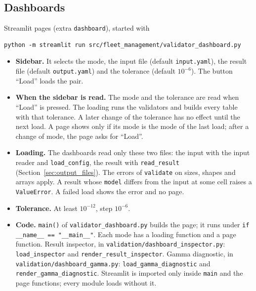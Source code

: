 \tabend

\subsection{Dashboards}
\label{sec:validation_dashboards}

Streamlit pages (extra \texttt{dashboard}), started with
\begin{lstlisting}
python -m streamlit run src/fleet_management/validator_dashboard.py
\end{lstlisting}
\begin{itemize}[nosep]
  \item \textbf{Sidebar.} It selects the mode, the input file (default \texttt{input.yaml}), the result file (default \texttt{output.yaml}) and the tolerance (default $10^{-6}$). The button ``Load'' loads the pair.
  \item \textbf{When the sidebar is read.} The mode and the tolerance are read when ``Load'' is pressed. The loading runs the validators and builds every table with that tolerance. A later change of the tolerance has no effect until the next load. A page shows only if its mode is the mode of the last load; after a change of mode, the page asks for ``Load''.
  \item \textbf{Loading.} The dashboards read only these two files: the input with the input reader and \texttt{load\_config}, the result with \texttt{read\_result} (Section~\ref{sec:output_files}). The errors of \texttt{validate} on sizes, shapes and arrays apply. A result whose \texttt{model} differs from the input at some cell raises a \texttt{ValueError}. A failed load shows the error and no page.
  \item \textbf{Tolerance.} At least $10^{-12}$, step $10^{-6}$.
  \item \textbf{Code.} \texttt{main()} of \texttt{validator\_dashboard.py} builds the page; it runs under \texttt{if \_\_name\_\_ == "\_\_main\_\_"}. Each mode has a loading function and a page function. Result inspector, in \texttt{validation/dashboard\_inspector.py}: \texttt{load\_inspector} and \texttt{render\_result\_inspector}. Gamma diagnostic, in \texttt{validation/dashboard\_gamma.py}: \texttt{load\_gamma\_diagnostic} and \texttt{render\_gamma\_diagnostic}. Streamlit is imported only inside \texttt{main} and the page functions; every module loads without it.
\end{itemize}

